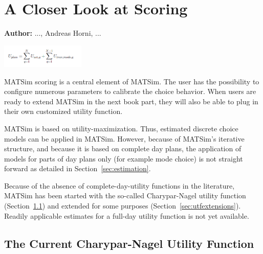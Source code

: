 \chapter{A Closer Look at Scoring}
\label{ch:scoring}

\hfill \textbf{Author:} ..., Andreas Horni, ...

\begin{center} \includegraphics[width=0.3\textwidth, angle=0]{using/figures/utf.png} \end{center}

MATSim scoring is a central element of MATSim. The user has the possibility to configure numerous parameters to calibrate the choice behavior.  When users are ready to extend MATSim in the next book part, they will also be able to plug in their own customized utility function.

MATSim is based on utility-maximization. Thus, estimated discrete choice models can be applied in MATSim. However, because of MATSim's iterative structure, and because it is based on complete day plans, the application of models for parts of day plans only (for example mode choice) is not straight forward as detailed in Section~\ref{sec:estimation}.


Because of the absence of complete-day-utility functions in the literature, MATSim has been started with the so-called Charypar-Nagel utility function (Section~\ref{sec:charyparnagel}) and extended for some purposes (Section~\ref{sec:utfextensions}). Readily applicable estimates for a full-day utility function is not yet available. 

\section{The Current Charypar-Nagel Utility Function}
\label{sec:charyparnagel}

